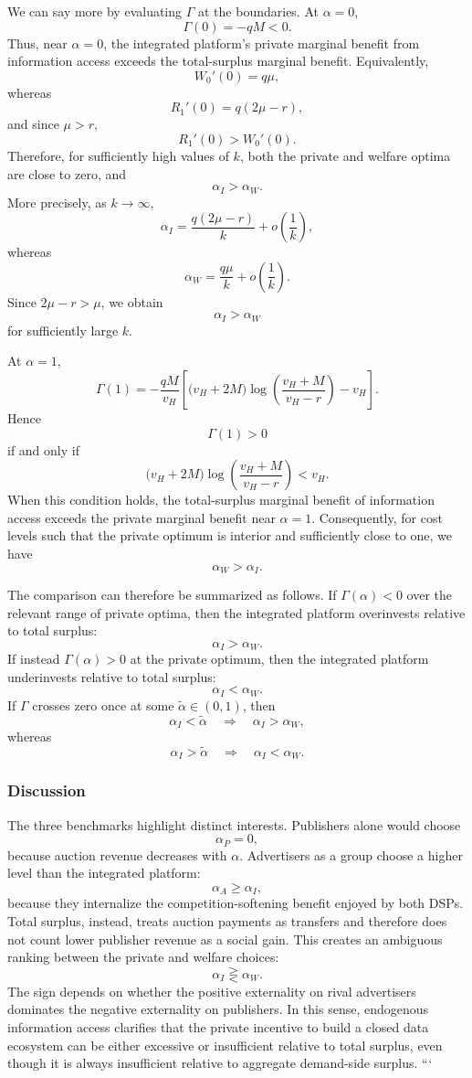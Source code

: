 We can say more by evaluating $\Gamma$ at the boundaries. At $\alpha=0$,
\[
\Gamma(0)=-qM<0.
\]
Thus, near $\alpha=0$, the integrated platform's private marginal benefit from information
access exceeds the total-surplus marginal benefit. Equivalently,
\[
W_0'(0)=q\mu,
\]
whereas
\[
R_1'(0)=q(2\mu-r),
\]
and since $\mu>r$,
\[
R_1'(0)>W_0'(0).
\]
Therefore, for sufficiently high values of $k$, both the private and welfare optima are close to
zero, and
\[
\alpha_I>\alpha_W.
\]
More precisely, as $k\to\infty$,
\[
\alpha_I
=
\frac{q(2\mu-r)}{k}
+
o\left(\frac{1}{k}\right),
\]
whereas
\[
\alpha_W
=
\frac{q\mu}{k}
+
o\left(\frac{1}{k}\right).
\]
Since $2\mu-r>\mu$, we obtain
\[
\alpha_I>\alpha_W
\]
for sufficiently large $k$.

At $\alpha=1$,
\[
\Gamma(1)
=
-\frac{qM}{v_H}
\left[
\big(v_H+2M\big)
\log\left(
\frac{v_H+M}{v_H-r}
\right)
-v_H
\right].
\]
Hence
\[
\Gamma(1)>0
\]
if and only if
\[
\big(v_H+2M\big)
\log\left(
\frac{v_H+M}{v_H-r}
\right)
<
v_H.
\]
When this condition holds, the total-surplus marginal benefit of information access exceeds
the private marginal benefit near $\alpha=1$. Consequently, for cost levels such that the private
optimum is interior and sufficiently close to one, we have
\[
\alpha_W>\alpha_I.
\]

The comparison can therefore be summarized as follows. If $\Gamma(\alpha)<0$ over the relevant
range of private optima, then the integrated platform overinvests relative to total surplus:
\[
\alpha_I>\alpha_W.
\]
If instead $\Gamma(\alpha)>0$ at the private optimum, then the integrated platform underinvests
relative to total surplus:
\[
\alpha_I<\alpha_W.
\]
If $\Gamma$ crosses zero once at some $\tilde\alpha\in(0,1)$, then
\[
\alpha_I<\tilde\alpha
\quad\Longrightarrow\quad
\alpha_I>\alpha_W,
\]
whereas
\[
\alpha_I>\tilde\alpha
\quad\Longrightarrow\quad
\alpha_I<\alpha_W.
\]

\subsubsection{Discussion}

The three benchmarks highlight distinct interests. Publishers alone would choose
\[
\alpha_P=0,
\]
because auction revenue decreases with $\alpha$. Advertisers as a group choose a higher level
than the integrated platform:
\[
\alpha_A\ge \alpha_I,
\]
because they internalize the competition-softening benefit enjoyed by both DSPs. Total surplus,
instead, treats auction payments as transfers and therefore does not count lower publisher
revenue as a social gain. This creates an ambiguous ranking between the private and welfare
choices:
\[
\alpha_I\gtreqless \alpha_W.
\]
The sign depends on whether the positive externality on rival advertisers dominates the negative
externality on publishers. In this sense, endogenous information access clarifies that the private
incentive to build a closed data ecosystem can be either excessive or insufficient relative to total
surplus, even though it is always insufficient relative to aggregate demand-side surplus.
```
